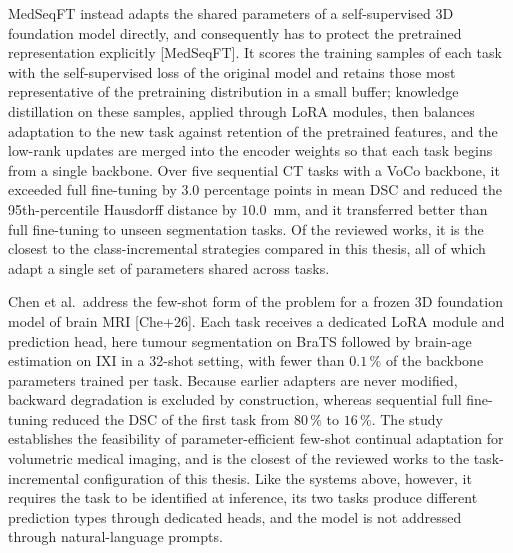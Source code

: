 MedSeqFT instead adapts the shared parameters of a self-supervised 3D foundation model directly, and consequently has to protect the pretrained representation explicitly [MedSeqFT]. It scores the training samples of each task with the self-supervised loss of the original model and retains those most representative of the pretraining distribution in a small buffer; knowledge distillation on these samples, applied through LoRA modules, then balances adaptation to the new task against retention of the pretrained features, and the low-rank updates are merged into the encoder weights so that each task begins from a single backbone. Over five sequential CT tasks with a VoCo backbone, it exceeded full fine-tuning by $3.0$ percentage points in mean DSC and reduced the 95th-percentile Hausdorff distance by $10.0$~mm, and it transferred better than full fine-tuning to unseen segmentation tasks. Of the reviewed works, it is the closest to the class-incremental strategies compared in this thesis, all of which adapt a single set of parameters shared across tasks.

Chen et al.\ address the few-shot form of the problem for a frozen 3D foundation model of brain MRI [Che+26]. Each task receives a dedicated LoRA module and prediction head, here tumour segmentation on BraTS followed by brain-age estimation on IXI in a 32-shot setting, with fewer than $0.1\,\%$ of the backbone parameters trained per task. Because earlier adapters are never modified, backward degradation is excluded by construction, whereas sequential full fine-tuning reduced the DSC of the first task from $80\,\%$ to $16\,\%$. The study establishes the feasibility of parameter-efficient few-shot continual adaptation for volumetric medical imaging, and is the closest of the reviewed works to the task-incremental configuration of this thesis. Like the systems above, however, it requires the task to be identified at inference, its two tasks produce different prediction types through dedicated heads, and the model is not addressed through natural-language prompts.


